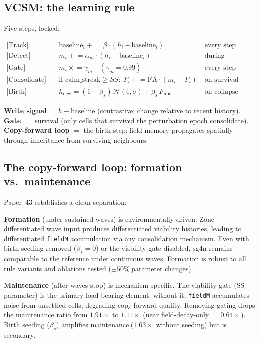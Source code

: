 \documentclass[11pt]{article}
\begin{document}
\subsection{VCSM: the learning rule}

Five steps, locked:

\begin{align}
\text{[Track]}       &\quad \text{baseline}_i \mathrel{+}= \beta \cdot (h_i - \text{baseline}_i) && \text{every step} \nonumber\\
\text{[Detect]}      &\quad m_i \mathrel{+}= \alpha_m \cdot (h_i - \text{baseline}_i)              && \text{during perturbation} \nonumber\\
\text{[Gate]}        &\quad m_i \mathrel{\times}= \gamma_m \quad (\gamma_m = 0.99)                 && \text{every step} \nonumber\\
\text{[Consolidate]} &\quad \text{if calm\_streak} \geq SS:\; F_i \mathrel{+}= \mathrm{FA} \cdot (m_i - F_i) && \text{on survival} \nonumber\\
\text{[Birth]}       &\quad h_\mathrm{new} = (1-\beta_s)\,\mathcal{N}(0,\sigma) + \beta_s\,F_{\text{nbr}} && \text{on collapse} \nonumber
\end{align}

\textbf{Write signal} $= h - \mathrm{baseline}$ (contrastive: change relative to recent
history).
\textbf{Gate} $=$ survival (only cells that survived the perturbation epoch consolidate).
\textbf{Copy-forward loop} $=$ the birth step: field memory propagates spatially through
inheritance from surviving neighbours.

\subsection{The copy-forward loop: formation vs.\ maintenance}

Paper~43 establishes a clean separation:

\textbf{Formation} (under sustained waves) is environmentally driven.
Zone-differentiated wave input produces differentiated viability histories, leading to
differentiated \texttt{fieldM} accumulation via any consolidation mechanism.
Even with birth seeding removed ($\beta_s = 0$) or the viability gate disabled,
sg4n remains comparable to the reference under continuous waves.
Formation is robust to all rule variants and ablations tested ($\pm50\%$ parameter changes).

\textbf{Maintenance} (after waves stop) is mechanism-specific.
The viability gate (SS parameter) is the primary load-bearing element:
without it, \texttt{fieldM} accumulates noise from unsettled cells, degrading copy-forward quality.
Removing gating drops the maintenance ratio from $1.91\times$ to $1.11\times$ (near
field-decay-only $= 0.64\times$).
Birth seeding ($\beta_s$) amplifies maintenance ($1.63\times$ without seeding) but is secondary.
\end{document}
